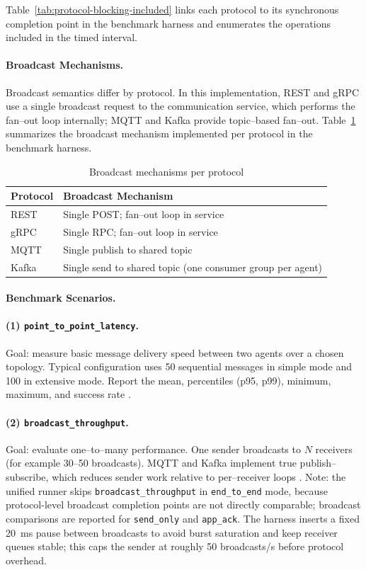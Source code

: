 Table~\ref{tab:protocol-blocking-included} links each protocol to its synchronous completion point in the benchmark harness and enumerates the operations included in the timed interval.

\paragraph{Broadcast Mechanisms.}
Broadcast semantics differ by protocol. In this implementation, REST and gRPC use a single broadcast request to the communication service, which performs the fan--out loop internally; MQTT and Kafka provide topic--based fan--out. Table~\ref{tab:protocol-broadcast} summarizes the broadcast mechanism implemented per protocol in the benchmark harness.

\begin{table}[H]
\centering
\label{tab:protocol-broadcast}
\begin{tabular}{l|l}
\toprule
\textbf{Protocol} & \textbf{Broadcast Mechanism} \\
\midrule
REST  & Single POST; fan--out loop in service \\
gRPC  & Single RPC; fan--out loop in service \\
MQTT  & Single publish to shared topic \\
Kafka & Single send to shared topic (one consumer group per agent) \\
\bottomrule
\end{tabular}
\caption{Broadcast mechanisms per protocol}
\end{table}

\paragraph{Benchmark Scenarios.}
\paragraph{(1) \texttt{point\_to\_point\_latency}.}
Goal: measure basic message delivery speed between two agents over a chosen topology. Typical configuration uses 50 sequential messages in simple mode and 100 in extensive mode. Report the mean, percentiles (p95, p99), minimum, maximum, and success rate \cite{DeanBarroso2013TailAtScale,Jain1991PerformanceAnalysis}.

\paragraph{(2) \texttt{broadcast\_throughput}.}
Goal: evaluate one--to--many performance. One sender broadcasts to $N$ receivers (for example 30--50 broadcasts). MQTT and Kafka implement true publish--subscribe, which reduces sender work relative to per--receiver loops \cite{MQTTv5Spec,apache_kafka_docs}.
Note: the unified runner skips \texttt{broadcast\_throughput} in \texttt{end\_to\_end} mode, because protocol-level broadcast completion points are not directly comparable; broadcast comparisons are reported for \texttt{send\_only} and \texttt{app\_ack}.
The harness inserts a fixed 20~ms pause between broadcasts to avoid burst saturation and keep receiver queues stable; this caps the sender at roughly 50 broadcasts/s before protocol overhead.

